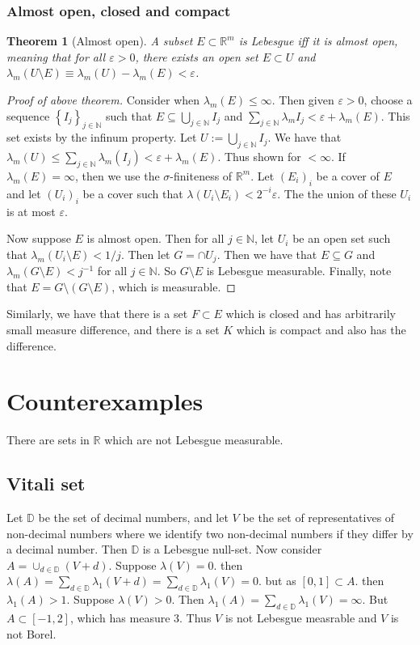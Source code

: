 \documentclass{article}
\newtheorem{theorem}{Theorem}
\theoremstyle{definition}
\numberwithin{theorem}{section}
\numberwithin{equation}{section}
\begin{document}
\subsubsection{Almost open, closed and compact}
\begin{theorem}[Almost open]
	A subset $E \subset \mathbb{R}^m$ is Lebesgue iff it is almost open, meaning that for all $\varepsilon > 0$, there exists an open set $E \subset U$ and $\lambda_m(U\setminus E) \equiv \lambda_m(U) - \lambda_m(E) < \varepsilon$. 
\end{theorem}
\begin{proof}[Proof of above theorem]
	Consider when $\lambda_m(E) \leq \infty$. Then given $\varepsilon > 0$, choose a sequence $\left\lbrace I_j \right\rbrace_{j \in \mathbb{N}} $ such that $E \subseteq \bigcup_{j \in \mathbb{N}}I_j$ and $\sum_{j \in \mathbb{N}} \lambda_mI_j < \varepsilon + \lambda_m(E)$. This set exists by the infinum property.
	Let $U := \bigcup_{j \in \mathbb{N}}I_j$. We have that $\lambda_m(U) \leq \sum_{j \in \mathbb{N}}\lambda_m(I_j) < \varepsilon + \lambda_m(E)$. Thus shown for $< \infty$. If $\lambda_m(E) = \infty$, then we use the $\sigma$-finiteness of $\mathbb{R}^m$. Let $(E_i)_i$ be a cover of $E$ and let $(U_i)_i$ be a cover such that $\lambda(U_i\setminus E_i) < 2^{-i} \varepsilon$. The the union of these $U_i$ is at most $ \varepsilon$. 
	
	Now suppose $E$ is almost open. Then for all $j \in \mathbb{N}$, let $U_i$ be an open set such that $\lambda_m(U_i \setminus E) < 1/j$. Then let $G = \cap U_j$. Then we have that $E \subseteq G$ and $\lambda_m(G \setminus E) < j^{-1}$ for all $j \in \mathbb{N}$. So $G \setminus E$ is Lebesgue measurable. Finally, note that $E =G \setminus (G \setminus E)$, which is measurable. 
\end{proof}

Similarly, we have that there is a set $F \subset E$ which is closed and has arbitrarily small measure difference, and there is a set $K$ which is compact and also has the difference.

\section{Counterexamples}
There are sets in $\mathbb{R}$ which are not Lebesgue measurable.
\subsection{Vitali set}
Let $\mathbb{D}$ be the set of decimal numbers, and let $V$ be the set of representatives of non-decimal numbers where we identify two non-decimal numbers if they differ by a decimal number. Then $\mathbb{D}$ is a Lebesgue null-set. 
Now consider $A = \cup_{d \in \mathbb{D}}(V + d)$. Suppose $\lambda(V) = 0$. then $\lambda(A) = \sum_{d \in \mathbb{D}} \lambda_1(V + d) = \sum_{d \in \mathbb{D}} \lambda_1(V) = 0$. but as $[0, 1] \subset A$. then $\lambda_1(A) > 1$.
Suppose $\lambda(V) > 0$. Then $\lambda_1(A) =  \sum_{d \in \mathbb{D}} \lambda_1(V)  = \infty$. But $A \subset [-1, 2]$, which has measure 3. Thus $V$ is not Lebesgue measrable and $V$ is not Borel. 
\end{document}
